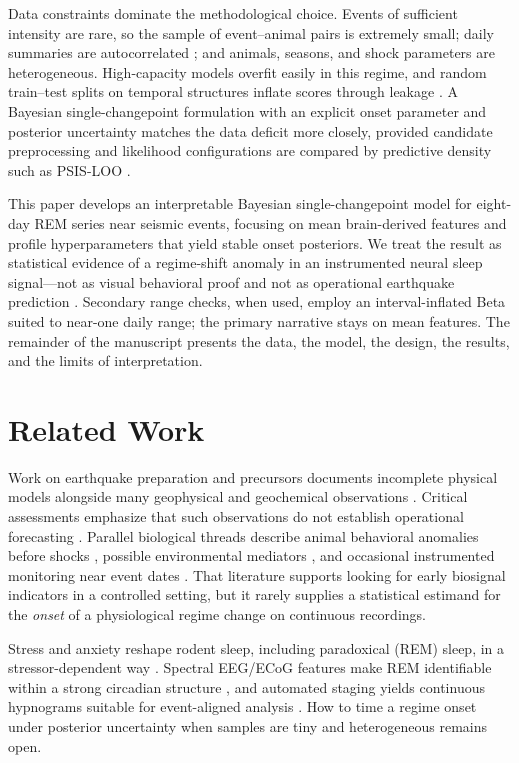 Data constraints dominate the methodological choice. Events of sufficient intensity are rare, so the sample of event–animal pairs is extremely small; daily summaries are autocorrelated \cite{Hyndman2018}; and animals, seasons, and shock parameters are heterogeneous. High-capacity models overfit easily in this regime, and random train–test splits on temporal structures inflate scores through leakage \cite{Bergmeir2012}. A Bayesian single-changepoint formulation with an explicit onset parameter and posterior uncertainty \cite{carlin1992hierarchical,Sinkovec2022} matches the data deficit more closely, provided candidate preprocessing and likelihood configurations are compared by predictive density such as PSIS-LOO \cite{Vehtari2017}.

This paper develops an interpretable Bayesian single-changepoint model for eight-day REM series near seismic events, focusing on mean brain-derived features and profile hyperparameters that yield stable onset posteriors. We treat the result as statistical evidence of a regime-shift anomaly in an instrumented neural sleep signal—not as visual behavioral proof and not as operational earthquake prediction \cite{Geller1997}. Secondary range checks, when used, employ an interval-inflated Beta suited to near-one daily range; the primary narrative stays on mean features. The remainder of the manuscript presents the data, the model, the design, the results, and the limits of interpretation.

\section{Related Work}

Work on earthquake preparation and precursors documents incomplete physical models alongside many geophysical and geochemical observations \cite{Rodkin2011,Cicerone2009,Conti2021}. Critical assessments emphasize that such observations do not establish operational forecasting \cite{Geller1997,Conti2021}. Parallel biological threads describe animal behavioral anomalies before shocks \cite{Kirschvink2000}, possible environmental mediators \cite{Grant2011}, and occasional instrumented monitoring near event dates \cite{Yokoi2003}. That literature supports looking for early biosignal indicators in a controlled setting, but it rarely supplies a statistical estimand for the \emph{onset} of a physiological regime change on continuous recordings.

Stress and anxiety reshape rodent sleep, including paradoxical (REM) sleep, in a stressor-dependent way \cite{Rampin1991,Meerlo1997,Palma2000,Sanford2003}. Spectral EEG/ECoG features make REM identifiable within a strong circadian structure \cite{Fang2010,Vyazovskiy2005}, and automated staging yields continuous hypnograms suitable for event-aligned analysis \cite{Saevskiy2025}. How to time a regime onset under posterior uncertainty when samples are tiny and heterogeneous remains open.

